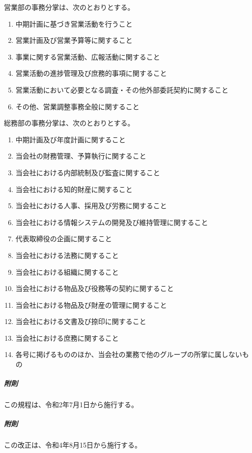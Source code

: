 \documentclass[10pt,a4paper,uplatex]{jsarticle}
\begin{document}
営業部の事務分掌は、次のとおりとする。
\begin{enumerate}
	\item 中期計画に基づき営業活動を行うこと	
	\item 営業計画及び営業予算等に関すること
	\item 事業に関する営業活動、広報活動に関すること
	\item 営業活動の進捗管理及び庶務的事項に関すること
	\item 営業活動において必要となる調査・その他外部委託契約に関すること
	\item その他、営業調整事務全般に関すること
\end{enumerate}

総務部の事務分掌は、次のとおりとする。
\begin{enumerate}
	\item 中期計画及び年度計画に関すること
	\item 当会社の財務管理、予算執行に関すること
	\item 当会社における内部統制及び監査に関すること
	\item 当会社における知的財産に関すること
	\item 当会社における人事、採用及び労務に関すること
	\item 当会社における情報システムの開発及び維持管理に関すること
	\item 代表取締役の企画に関すること
	\item 当会社における法務に関すること
	\item 当会社における組織に関すること
	\item 当会社における物品及び役務等の契約に関すること
	\item 当会社における物品及び財産の管理に関すること
	\item 当会社における文書及び捺印に関すること
	\item 当会社における庶務に関すること
	\item 各号に掲げるもののほか、当会社の業務で他のグループの所掌に属しないもの
\end{enumerate}

\vspace{1cm}
\subparagraph{附則}
この規程は、令和2年7月1日から施行する。
\subparagraph{附則}
この改正は、令和4年8月15日から施行する。 
\end{document}
